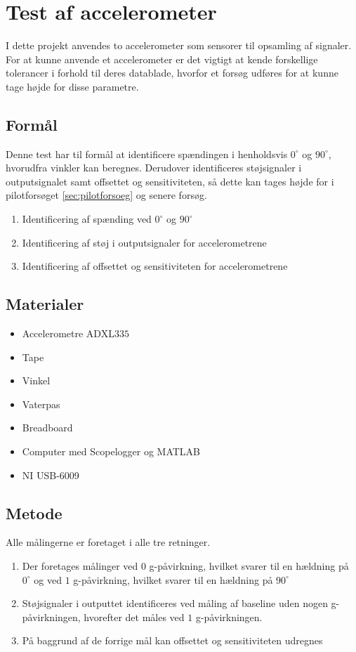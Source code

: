 \section{Test af accelerometer} 
\label{sec:test_acc}
I dette projekt anvendes to accelerometer som sensorer til opsamling af signaler. For at kunne anvende et accelerometer er det vigtigt at kende forskellige tolerancer i forhold til deres datablade, hvorfor et forsøg udføres for at kunne tage højde for disse parametre.

\subsection{Formål}
Denne test har til formål at identificere spændingen i henholdsvis $0^{\circ}$ og $90^{\circ}$, hvorudfra vinkler kan beregnes. Derudover identificeres støjsignaler i outputsignalet samt offsettet og sensitiviteten, så dette kan tages højde for i pilotforsøget \autoref{sec:pilotforsoeg} og senere forsøg.

\begin{enumerate}
\item Identificering af spænding ved $0^{\circ}$ og $90^{\circ}$
\item Identificering af støj i outputsignaler for accelerometrene
\item Identificering af offsettet og sensitiviteten for accelerometrene
\end{enumerate}

\subsection{Materialer}
\begin{itemize}
\item Accelerometre ADXL$335$
\item Tape
\item Vinkel
\item Vaterpas
\item Breadboard
\item Computer med Scopelogger og MATLAB
\item NI USB-6009
\end{itemize}

\subsection{Metode}
Alle målingerne er foretaget i alle tre retninger. 
\begin{enumerate}
\item Der foretages målinger ved $0$ g-påvirkning, hvilket svarer til en hældning på $0^{\circ}$ og ved $1$ g-påvirkning, hvilket svarer til en hældning på $90^{\circ}$
\item Støjsignaler i outputtet identificeres ved måling af baseline uden nogen g-påvirkningen, hvorefter det måles ved $1$ g-påvirkningen. 
\item På baggrund af de forrige mål kan offsettet og sensitiviteten udregnes
\end{enumerate}

